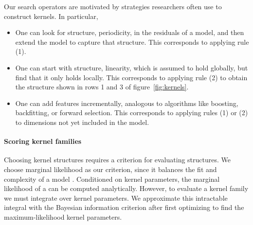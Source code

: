Our search operators are motivated by strategies researchers often use to construct kernels.
In particular,
\begin{itemize}
\item One can look for structure, \eg periodicity, in the residuals of a model, and then extend the model to capture that structure.
This corresponds to applying rule (1).
\item One can start with structure, \eg linearity, which is assumed to hold globally, but find that it only holds locally.
This corresponds to applying rule (2) to obtain the structure shown in rows 1 and 3 of figure~\ref{fig:kernels}.
\item One can add features incrementally, analogous to algorithms like boosting, backfitting, or forward selection.
This corresponds to applying rules (1) or (2) to dimensions not yet included in the model.
\end{itemize}

\paragraph{Scoring kernel families}

Choosing kernel structures requires a criterion for evaluating structures.
We choose marginal likelihood as our criterion, since it balances the fit and complexity of a model \citep{rasmussen2001occam}.
Conditioned on kernel parameters, the marginal likelihood of a \gp{} can be computed analytically.
However, to evaluate a kernel family we must integrate over kernel parameters.
We approximate this intractable integral with the Bayesian information criterion \citep{schwarz1978estimating} after first optimizing to find the maximum-likelihood kernel parameters.


